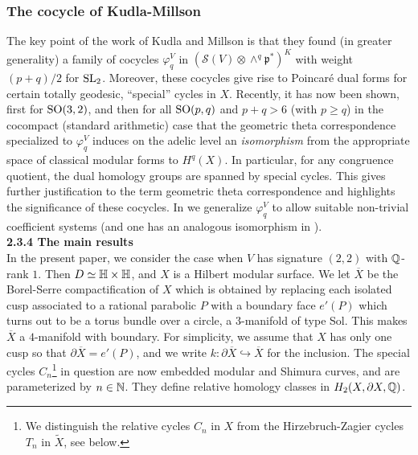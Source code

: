 \subsubsection*{The cocycle of Kudla-Millson}

The key point of the work of Kudla and Millson \cite{KM1,KM2} is that they found (in greater generality) a family of cocycles $\varphi^V_{q}$ in $(\mathcal{S}(V) \otimes \wedge^q \mathfrak{p}^{\ast})^K$ with weight $(p+q)/2$ for $\operatorname{SL}_2$. Moreover, these cocycles give rise to Poincar\'e dual forms for certain totally geodesic, ``special'' cycles in $X$. Recently, it has now been shown, first \cite{HoffmanHe} for $\operatorname{SO}(3,2)$, and then \cite{BMM} for all $\operatorname{SO}(p,q)$ and $p+q>6$ (with $p \geq q$) in the cocompact (standard arithmetic) case that the geometric theta correspondence specialized to $\varphi_q^V$ induces on the adelic level an {\it isomorphism} from the appropriate space of classical modular forms to $H^q(X)$. In particular, for any congruence quotient, the dual homology groups are spanned by special cycles. This gives further justification to the term geometric theta correspondence and highlights the significance of these cocycles. In \cite{FMcoeff} we generalize $\varphi^V_{q}$ to allow suitable non-trivial coefficient systems (and one has an analogous isomorphism in \cite{BMM}). 
\\[12pt] 
\textbf{2.3.4 The main results} 
\\[10pt]
In the present paper, we consider the case when $V$ has signature $(2,2)$ with $\mathbb{Q}$-rank $1$. Then $D \simeq \mathbb{H} \times \mathbb{H}$, and $X$ is a Hilbert modular surface. We let $\overline{X}$ be the Borel-Serre compactification of $X$ which is obtained by replacing each isolated cusp associated to a rational parabolic $P$ with a boundary face $e'(P)$ which turns out to be a torus bundle over a circle, a $3$-manifold of type Sol. This makes $\overline{X}$ a $4$-manifold with boundary.  For simplicity, we assume that $X$ has only one cusp so that $\partial \overline{X} = e'(P)$, and we write $k: \partial \overline{X}  \hookrightarrow \overline{X}$ for the inclusion. The special cycles $C_n$\footnote{We distinguish the relative cycles $C_n$ in $X$ from the Hirzebruch-Zagier cycles $T_n$ in $\tilde{X}$, see below.} in question are now embedded modular and Shimura curves, and are parameterized by $n \in \mathbb{N}$. They define relative homology classes in $H_2(X, \partial X,\mathbb{Q})$. 
